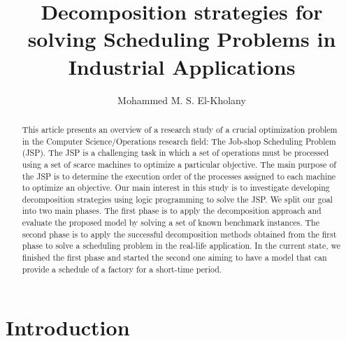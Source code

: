 \documentclass[submission,copyright,creativecommons]{eptcs}
\title{Decomposition strategies for solving Scheduling Problems in Industrial Applications}
\author{Mohammed M. S. El-Kholany
\institute{University of Klagenfurt \\ Klagenfurt, Austria}
\institute{Cairo University \\ Cairo, Egypt}
\email{mohammed.el-kholany@aau.at}
}
\begin{document}
\maketitle

\begin{abstract}
  This article presents an overview of a research study of a crucial optimization problem in the Computer Science/Operations research field: The Job-shop Scheduling Problem (JSP). The JSP is a challenging task in which a set of operations must be processed using a set of scarce machines to optimize a particular objective. The main purpose of the JSP is to determine the execution order of the processes assigned to each machine to optimize an objective. Our main interest in this study is to investigate developing decomposition strategies using logic programming to solve the JSP. We split our goal into two main phases. The first phase is to apply the decomposition approach and evaluate the proposed model by solving a set of known benchmark instances. The second phase is to apply the successful decomposition methods obtained from the first phase to solve a scheduling problem in the real-life application. In the current state, we finished the first phase and started the second one aiming to have a model that can provide a schedule of a factory for a short-time period.
\end{abstract}

\section{Introduction}
\end{document}
